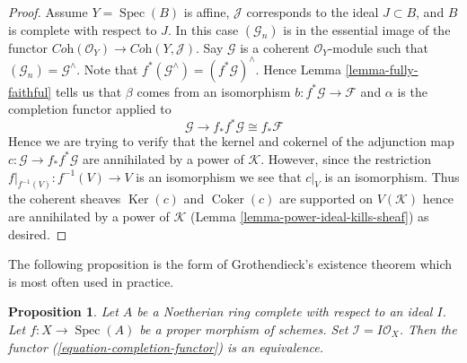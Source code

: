\documentclass{stacks-project}
\theoremstyle{plain}
\newtheorem{proposition}[subsection]{Proposition}
\theoremstyle{definition}
\theoremstyle{remark}
\numberwithin{equation}{subsection}
\def\Spec{\mathop{\mathrm{Spec}}}
\def\Ker{\mathop{\mathrm{Ker}}}
\def\Coker{\mathop{\mathrm{Coker}}}
\begin{document}
\begin{proof}
\medskip\noindent
Assume $Y = \Spec(B)$ is affine, $\mathcal{J}$ corresponds to the ideal
$J \subset B$, and $B$ is complete with respect to $J$.
In this case $(\mathcal{G}_n)$ is in the essential image of the functor
$\textit{Coh}(\mathcal{O}_Y) \to \textit{Coh}(Y, \mathcal{J})$.
Say $\mathcal{G}$ is a coherent $\mathcal{O}_Y$-module such that
$(\mathcal{G}_n) = \mathcal{G}^\wedge$. Note that
$f^*(\mathcal{G}^\wedge) = (f^*\mathcal{G})^\wedge$. Hence
Lemma \ref{lemma-fully-faithful}
tells us that $\beta$ comes from an isomorphism
$b : f^*\mathcal{G} \to \mathcal{F}$
and $\alpha$ is the completion functor applied to
$$
\mathcal{G} \to f_*f^*\mathcal{G} \cong f_*\mathcal{F}
$$
Hence we are trying to verify that the kernel and cokernel of the
adjunction map $c : \mathcal{G} \to f_*f^*\mathcal{G}$ are annihilated by
a power of $\mathcal{K}$. However, since the restriction
$f|_{f^{-1}(V)} : f^{-1}(V) \to V$ is an isomorphism
we see that $c|_V$ is an isomorphism. Thus the coherent sheaves
$\Ker(c)$ and $\Coker(c)$ are supported on $V(\mathcal{K})$
hence are annihilated by a power of $\mathcal{K}$
(Lemma \ref{lemma-power-ideal-kills-sheaf}) as desired.
\end{proof}

\noindent
The following proposition is the form of Grothendieck's existence
theorem which is most often used in practice.

\begin{proposition}
\label{proposition-existence-proper}
Let $A$ be a Noetherian ring complete with respect to an ideal $I$.
Let $f : X \to \Spec(A)$ be a proper morphism of schemes.
Set $\mathcal{I} = I\mathcal{O}_X$.
Then the functor (\ref{equation-completion-functor}) is an equivalence.
\end{proposition}
\end{document}

